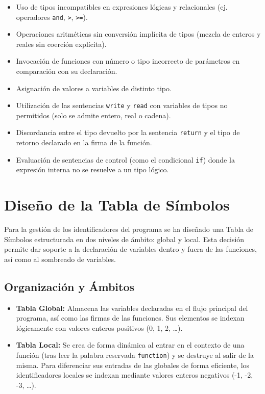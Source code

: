 \documentclass{article}
\begin{document}
\begin{itemize}
    \item Uso de tipos incompatibles en expresiones lógicas y relacionales (ej. operadores \texttt{and}, \texttt{>}, \texttt{>=}).
    \item Operaciones aritméticas sin conversión implícita de tipos (mezcla de enteros y reales sin coerción explícita).
    \item Invocación de funciones con número o tipo incorrecto de parámetros en comparación con su declaración.
    \item Asignación de valores a variables de distinto tipo.
    \item Utilización de las sentencias \texttt{write} y \texttt{read} con variables de tipos no permitidos (solo se admite entero, real o cadena).
    \item Discordancia entre el tipo devuelto por la sentencia \texttt{return} y el tipo de retorno declarado en la firma de la función.
    \item Evaluación de sentencias de control (como el condicional \texttt{if}) donde la expresión interna no se resuelve a un tipo lógico.
\end{itemize}

\newpage

\section{Diseño de la Tabla de Símbolos}

Para la gestión de los identificadores del programa se ha diseñado una Tabla de Símbolos estructurada en dos niveles de ámbito: global y local. Esta decisión permite dar soporte a la declaración de variables dentro y fuera de las funciones, así como al sombreado de variables.

\subsection{Organización y Ámbitos}
\begin{itemize}
    \item \textbf{Tabla Global:} Almacena las variables declaradas en el flujo principal del programa, así como las firmas de las funciones. Sus elementos se indexan lógicamente con valores enteros positivos (0, 1, 2, \dots).
    \item \textbf{Tabla Local:} Se crea de forma dinámica al entrar en el contexto de una función (tras leer la palabra reservada \texttt{function}) y se destruye al salir de la misma. Para diferenciar sus entradas de las globales de forma eficiente, los identificadores locales se indexan mediante valores enteros negativos (-1, -2, -3, \dots).
\end{itemize}
\end{document}

